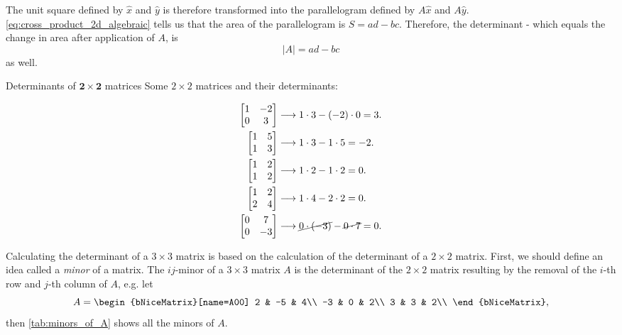 The unit square defined by $\hat{x}$ and $\hat{y}$ is therefore transformed into the parallelogram defined by $A\hat{x}$ and $A\hat{y}$. \autoref{eq:cross_product_2d_algebraic} tells us that the area of the parallelogram is $S=ad-bc$. Therefore, the determinant - which equals the change in area after application of $A$, is
\begin{equation}
	|A| = ad-bc
	\label{eq:determinant_2x2}
\end{equation}
as well.

\begin{example}{Determinants of $\bm{2\times2}$ matrices}{}
	Some $2\times2$ matrices and their determinants:

	\begin{align*}
		\begin{bmatrix} 1&-2\\0&3 \end{bmatrix} &\longrightarrow 1\cdot3-(-2)\cdot0 = 3.\\
		\begin{bmatrix} 1&5\\1&3 \end{bmatrix} &\longrightarrow 1\cdot3-1\cdot5 = -2.\\
		\begin{bmatrix} 1&2\\1&2 \end{bmatrix} &\longrightarrow 1\cdot2-1\cdot2 = 0.\\
		\begin{bmatrix} 1&2\\2&4 \end{bmatrix} &\longrightarrow 1\cdot4-2\cdot2 = 0.\\
		\begin{bmatrix} 0&7\\0&-3 \end{bmatrix} &\longrightarrow \cancel{0\cdot(-3)}-\cancel{0\cdot7} = 0.\\
	\end{align*}
\end{example}

Calculating the determinant of a $3\times3$ matrix is based on the calculation of the determinant of a $2\times2$ matrix. First, we should define an idea called a \emph{minor} of a matrix. The $ij$-minor of a $3\times3$ matrix $A$ is the determinant of the $2\times2$ matrix resulting by the removal of the $i$-th row and $j$-th column of $A$, e.g. let
\newcommand{\Aminor}[1]{
	\begin{bNiceMatrix}[name=#1]
		2 & -5 & 4\\
		-3 & 0 & 2\\
		3 & 3 & 2\\
	\end{bNiceMatrix}
}
\[
	A = \Aminor{A00},
\]
then \autoref{tab:minors_of_A} shows all the minors of $A$.

